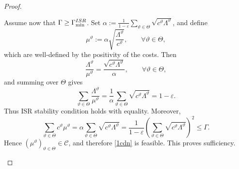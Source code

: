 \documentclass[10pt,a4paper]{amsart}
\begin{document}
\begin{proof}
\begin{enumerate}[label=\roman*), ref=\roman*]
Assume now that $\Gamma
\ge \Gamma_{\min}^{\rm ISR}$. Set $
\alpha:=
\frac{1}{1-\varepsilon}
\sum_{\vartheta\in\Theta}\sqrt{c^\vartheta\Lambda^\vartheta}$, 
and define
$$
\mu^\vartheta:=\alpha\sqrt{\frac{\Lambda^\vartheta}{c^\vartheta}},
\qquad \forall \vartheta\in\Theta,
$$
which are well-defined by the positivity of the costs. Then
$$
\frac{\Lambda^\vartheta}{\mu^\vartheta}
=
\frac{\sqrt{c^\vartheta\Lambda^\vartheta}}{\alpha},
\qquad \forall \vartheta\in\Theta,
$$
and summing over \(\Theta\) gives
$$
\sum_{\vartheta\in\Theta}\frac{\Lambda^\vartheta}{\mu^\vartheta}
=
\frac{1}{\alpha}\sum_{\vartheta\in\Theta}\sqrt{c^\vartheta\Lambda^\vartheta}
=
1-\varepsilon.
$$
Thus ISR stability condition holds with equality. Moreover,
$$
\sum_{\vartheta\in\Theta} c^\vartheta\mu^\vartheta
=
\alpha\sum_{\vartheta\in\Theta}\sqrt{c^\vartheta\Lambda^\vartheta}
=
\frac{1}{1-\varepsilon}
\left(\sum_{\vartheta\in\Theta}\sqrt{c^\vartheta\Lambda^\vartheta}\right)^2
\le \Gamma.
$$
Hence $(\mu^\vartheta)_{\vartheta\in\Theta}\in\mathcal C$, and therefore \eqref{1cdn} is feasible. This proves sufficiency.

\end{enumerate}
\end{proof}
\end{document}

